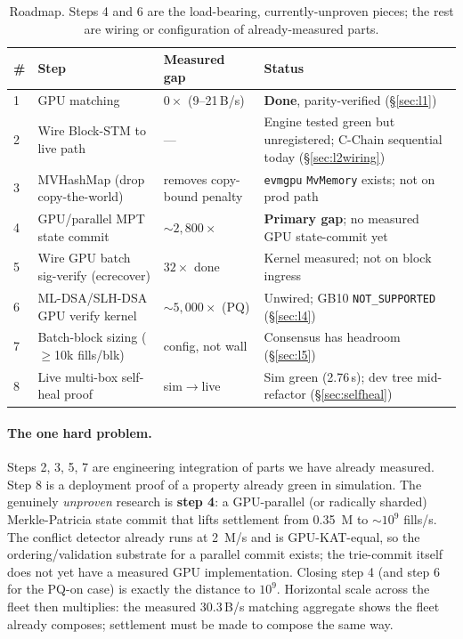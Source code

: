 \documentclass[11pt,a4paper]{article}
\begin{document}
\begin{table}[h]\centering\small
\begin{tabular}{@{}lllp{4.4cm}@{}}
\toprule
\# & Step & Measured gap & Status \\
\midrule
1 & GPU matching             & $0\times$ (9--21\,B/s) & \textbf{Done}, parity-verified (\S\ref{sec:l1}) \\
2 & Wire Block-STM to live path & --- & Engine tested green but unregistered; C-Chain sequential today (\S\ref{sec:l2wiring}) \\
3 & MVHashMap (drop copy-the-world) & removes copy-bound penalty & \texttt{evmgpu} \texttt{MvMemory} exists; not on prod path \\
4 & GPU/parallel MPT state commit & $\sim 2{,}800\times$ & \textbf{Primary gap}; no measured GPU state-commit yet \\
5 & Wire GPU batch sig-verify (ecrecover) & $32\times$ done & Kernel measured; not on block ingress \\
6 & ML-DSA/SLH-DSA GPU verify kernel & $\sim 5{,}000\times$ (PQ) & Unwired; GB10 \texttt{NOT\_SUPPORTED} (\S\ref{sec:l4}) \\
7 & Batch-block sizing ($\ge$10k fills/blk) & config, not wall & Consensus has headroom (\S\ref{sec:l5}) \\
8 & Live multi-box self-heal proof & sim$\to$live & Sim green (2.76\,s); dev tree mid-refactor (\S\ref{sec:selfheal}) \\
\bottomrule
\end{tabular}
\caption{Roadmap. Steps 4 and 6 are the load-bearing, currently-unproven
pieces; the rest are wiring or configuration of already-measured parts.}
\label{tab:roadmap}
\end{table}

\paragraph{The one hard problem.} Steps 2, 3, 5, 7 are engineering
integration of parts we have already measured. Step 8 is a deployment
proof of a property already green in simulation. The genuinely
\emph{unproven} research is \textbf{step 4}: a GPU-parallel (or radically
sharded) Merkle-Patricia state commit that lifts settlement from
\SI{0.35}{M} to ${\sim}10^{9}$ fills/s. The conflict detector already
runs at \SI{2}{M/s} and is GPU-KAT-equal, so the ordering/validation
substrate for a parallel commit exists; the trie-commit itself does not
yet have a measured GPU implementation. Closing step 4 (and step 6 for
the PQ-on case) is exactly the distance to $10^{9}$. Horizontal scale
across the fleet then multiplies: the measured 30.3\,B/s matching
aggregate shows the fleet already composes; settlement must be made to
compose the same way.
\end{document}
